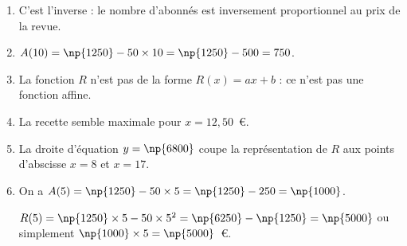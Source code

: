 \begin{enumerate}
\item %
C’est l’inverse : le nombre d’abonnés est inversement proportionnel au prix de la revue.
\item %
$A(10) = \np{1250} - 50 \times 10 = \np{1250} - 500 = 750$. 
\item %
La fonction $R$ n’est pas de la forme $R(x) = ax + b$ : ce n’est pas une fonction affine.
\item %
La recette semble maximale pour $x = 12,50$~\euro.
\item %
La droite d’équation $y = \np{6800}$ coupe la représentation de $R$ aux points d’abscisse $x = 8$ et $x = 17$. 
\item %
On a $A(5) = \np{1250} - 50 \times 5 = \np{1250} - 250 = \np{1000}$.

$R(5) = \np{1250}\times 5 - 50 \times 5^2 = \np{6250} - \np{1250} = \np{5000}$ ou simplement $\np{1000} \times 5 = \np{5000}$~\euro.
\end{enumerate}

\bigskip

